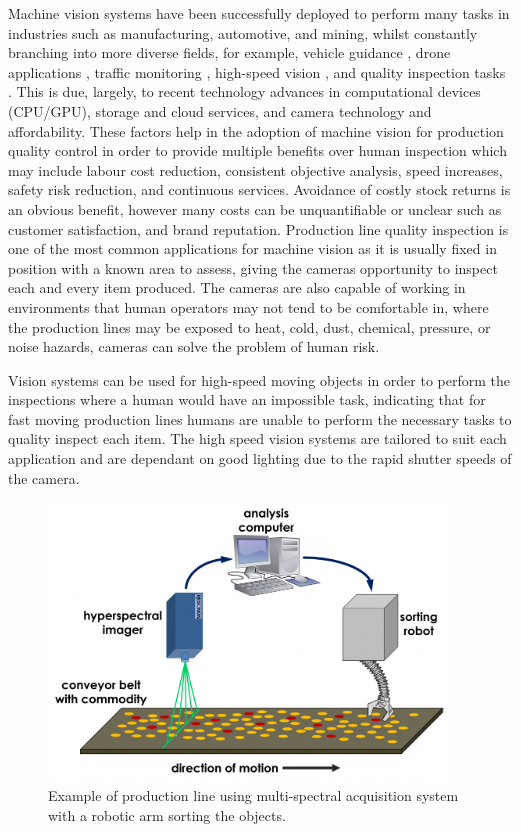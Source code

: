 \documentclass[fleqn,twoside,12pt]{report}
\begin{document}
Machine vision systems have been successfully deployed to perform many tasks in industries such as manufacturing, automotive, and mining, whilst constantly branching into more diverse fields, for example, vehicle guidance \cite{menze,urmson}, drone applications \cite{greene,boucher}, traffic monitoring \cite{cheung,kamijo}, high-speed vision \cite{watanabe,nakabo}, and quality inspection tasks \cite{cubero, du}. This is due, largely, to recent technology advances in computational devices (CPU/GPU), storage and cloud services, and camera technology and affordability. These factors help in the adoption of machine vision for production quality control in order to provide multiple benefits over human inspection which may include labour cost reduction, consistent objective analysis, speed increases, safety risk reduction, and continuous services. Avoidance of costly stock returns is an obvious benefit, however many costs can be unquantifiable or unclear such as customer satisfaction, and brand reputation. Production line quality inspection is one of the most common applications for machine vision as it is usually fixed in position with a known area to assess, giving the cameras opportunity to inspect each and every item produced. The cameras are also capable of working in environments that human operators may not tend to be comfortable in, where the production lines may be exposed to heat, cold, dust, chemical, pressure, or noise hazards, cameras can solve the problem of human risk. 

Vision systems can be used for high-speed moving objects in order to perform the inspections where a human would have an impossible task, indicating that for fast moving production lines humans are unable to perform the necessary tasks to quality inspect each item. The high speed vision systems are tailored to suit each application and are dependant on good lighting due to the rapid shutter speeds of the camera.




\begin{figure}[ht]
	\centering
	\includegraphics[width=300pt]{images/machine_vision.png}
	\caption{Example of production line using multi-spectral acquisition system with a robotic arm sorting the objects.}
	\label{fig:machine_vision}
\end{figure}
\end{document}
